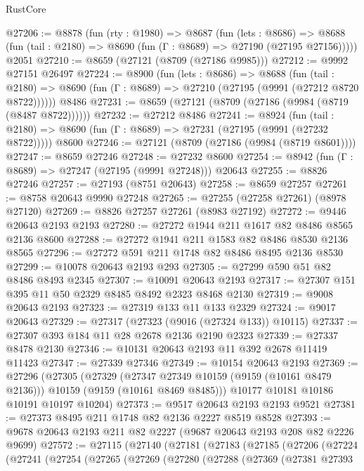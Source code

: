\begin{lexlean}{RustCore}
\begin{coremodule}
@27206 := @8878
    (fun (rty : @1980) =>
    @8687
      (fun (lets : @8686) =>
      @8688 (fun (tail : @2180) => @8690 (fun (Γ : @8689) => @27190 (@27195 @27156)))))
    @2051
@27210 := @8659 (@27121 (@8709 (@27186 @9985)))
@27212 := @9992 @27151 @26497
@27224 := @8900
    (fun (lets : @8686) =>
    @8688
      (fun (tail : @2180) =>
      @8690 (fun (Γ : @8689) => @27210 (@27195 (@9991 (@27212 @8720 @8722))))))
    @8486
@27231 := @8659 (@27121 (@8709 (@27186 (@9984 (@8719 (@8487 @8722))))))
@27232 := @27212 @8486
@27241 := @8924
    (fun (tail : @2180) => @8690 (fun (Γ : @8689) => @27231 (@27195 (@9991 (@27232 @8722)))))
    @8600
@27246 := @27121 (@8709 (@27186 (@9984 (@8719 @8601))))
@27247 := @8659 @27246
@27248 := @27232 @8600
@27254 := @8942 (fun (Γ : @8689) => @27247 (@27195 (@9991 @27248))) @20643
@27255 := @8826 @27246
@27257 := @27193 (@8751 @20643)
@27258 := @8659 @27257
@27261 := @8758 @20643 @9990 @27248
@27265 := @27255 (@27258 @27261) (@8978 @27120)
@27269 := @8826 @27257 @27261 (@8983 @27192)
@27272 := @9446 @20643 @2193 @2193
@27280 := @27272 @1944 @211 @1617 @82 @8486 @8565 @2136 @8600
@27288 := @27272 @1941 @211 @1583 @82 @8486 @8530 @2136 @8565
@27296 := @27272 @591 @211 @1748 @82 @8486 @8495 @2136 @8530
@27299 := @10078 @20643 @2193 @293
@27305 := @27299 @590 @51 @82 @8486 @8493 @2345
@27307 := @10091 @20643 @2193
@27317 := @27307 @151 @395 @11 @50 @2329 @8485 @8492 @2323 @8468 @2130
@27319 := @9008 @20643 @2193
@27323 := @27319 @133 @11 @133 @2329
@27324 := @9017 @20643
@27329 := @27317 (@27323 (@9016 (@27324 @133)) @10115)
@27337 := @27307 @393 @184 @11 @28 @2678 @2136 @2190 @2323
@27339 := @27337 @8478 @2130
@27346 := @10131 @20643 @2193 @11 @392 @2678 @11419 @11423
@27347 := @27339 @27346
@27349 := @10154 @20643 @2193
@27369 := @27296
    (@27305
      (@27329
        (@27347 @27349 @10159 (@9159 (@10161 @8479 @2136)))
        @10159
        (@9159 (@10161 @8469 @8485)))
      @10177
      @10181
      @10186
      @10191
      @10197
      @10204)
@27373 := @9517 @20643 @2193 @2193 @9521
@27381 := @27373 @8495 @211 @1748 @82 @2136 @2227 @8519 @8528
@27393 := @9678 @20643 @2193 @211 @82 @2227 (@9687 @20643 @2193 @208 @82 @2226 @9699)
@27572 := @27115
    (@27140
      (@27181
        (@27183
          (@27185
            (@27206
              (@27224
                (@27241
                  (@27254
                    (@27265
                      (@27269
                        (@27280
                          (@27288
                            (@27369
                              (@27381
                                @27393

\end{coremodule}
\end{lexlean}
